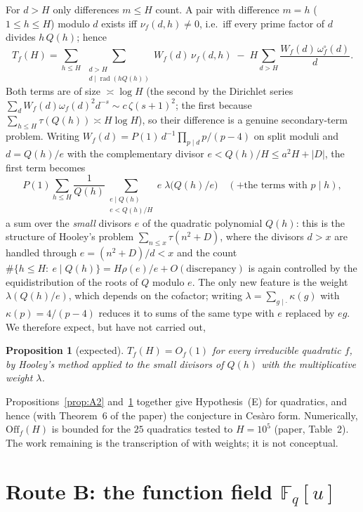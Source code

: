 \documentclass[11pt,a4paper]{article}
\newtheorem{proposition}[theorem]{Proposition}
\newcommand{\F}{\mathbb{F}}
\newcommand{\Off}{\mathrm{Off}}
\begin{document}
For $d>H$ only differences $m\le H$ count. A pair with difference $m=h$ ($1\le h\le H$) modulo $d$ exists
iff $\nu_f(d,h)\ne0$, i.e.\ iff every prime factor of $d$ divides $h\,Q(h)$; hence
\[
T_f(H)=\sum_{h\le H}\ \sum_{\substack{d>H\\ d\mid\operatorname{rad}(hQ(h))}}W_f(d)\,\nu_f(d,h)\;-\;H\sum_{d>H}\frac{W_f(d)\,\omega^\circ_f(d)}d .
\]
Both terms are of size $\asymp\log H$ (the second by the Dirichlet series
$\sum_dW_f(d)\omega_f(d)^2d^{-s}\sim c\,\zeta(s+1)^2$; the first because $\sum_{h\le H}\tau(Q(h))\asymp H\log H$),
so their difference is a genuine secondary-term problem. Writing $W_f(d)=P(1)\,d^{-1}\prod_{p\mid d}p/(p-4)$
on split moduli and $d=Q(h)/e$ with the complementary divisor $e<Q(h)/H\le a^2H+|D|$, the first term
becomes
\[
P(1)\sum_{h\le H}\frac1{Q(h)}\sum_{\substack{e\mid Q(h)\\ e<Q(h)/H}}e\;\lambda\bigl(Q(h)/e\bigr)\quad(+\text{the terms with }p\mid h),
\]
a sum over the \emph{small} divisors $e$ of the quadratic polynomial $Q(h)$: this is the structure of
Hooley's problem $\sum_{n\le x}\tau(n^2+D)$, where the divisors $d>x$ are handled through $e=(n^2+D)/d<x$
and the count $\#\{h\le H:\ e\mid Q(h)\}=H\rho(e)/e+O(\text{discrepancy})$ is again controlled by the
equidistribution of the roots of $Q$ modulo $e$. The only new feature is the weight $\lambda(Q(h)/e)$,
which depends on the cofactor; writing $\lambda=\sum_{g\mid\cdot}\kappa(g)$ with $\kappa(p)=4/(p-4)$
reduces it to sums of the same type with $e$ replaced by $eg$. We therefore expect, but have not carried
out,

\begin{proposition}[expected]\label{prop:A3}
$T_f(H)=O_f(1)$ for every irreducible quadratic $f$, by Hooley's method applied to the small divisors
of $Q(h)$ with the multiplicative weight $\lambda$.
\end{proposition}

Propositions~\ref{prop:A2} and~\ref{prop:A3} together give Hypothesis~(E) for quadratics, and hence
(with Theorem~6 of the paper) the conjecture in Ces\`aro form. Numerically, $\Off_f(H)$ is bounded for
the $25$ quadratics tested to $H=10^5$ (paper, Table~2). The work remaining is the transcription of
\cite{Hooley1963} with weights; it is not conceptual.

\section{Route B: the function field $\F_q[u]$}\label{sec:B}
\end{document}
